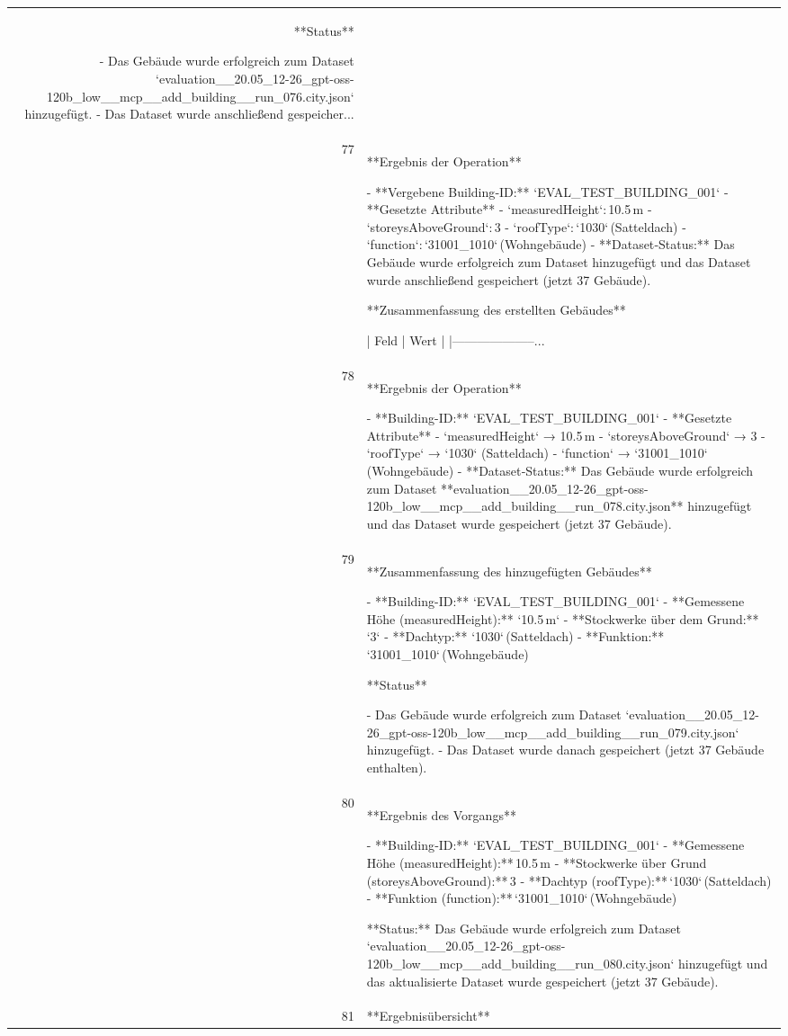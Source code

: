 \documentclass[a4paper,11pt]{article}
\begin{document}
\begin{table}[ht]
\begin{tabular}{r p{12cm}}
**Status**

- Das Gebäude wurde erfolgreich zum Dataset `evaluation\_\_20.05\_12-26\_gpt-oss-120b\_low\_\_mcp\_\_add\_building\_\_run\_076.city.json` hinzugefügt.  
- Das Dataset wurde anschließend gespeicher... \\
77 & **Ergebnis der Operation**

- **Vergebene Building‑ID:** `EVAL\_TEST\_BUILDING\_001`  
- **Gesetzte Attribute**  
  - `measuredHeight`: 10.5 m  
  - `storeysAboveGround`: 3  
  - `roofType`: `1030` (Satteldach)  
  - `function`: `31001\_1010` (Wohngebäude)  
- **Dataset‑Status:** Das Gebäude wurde erfolgreich zum Dataset hinzugefügt und das Dataset wurde anschließend gespeichert (jetzt 37 Gebäude).  

**Zusammenfassung des erstellten Gebäudes**  

| Feld                | Wert |
|--------------------... \\
78 & **Ergebnis der Operation**

- **Building-ID:** `EVAL\_TEST\_BUILDING\_001`  
- **Gesetzte Attribute**  
  - `measuredHeight` → 10.5 m  
  - `storeysAboveGround` → 3  
  - `roofType` → `1030` (Satteldach)  
  - `function` → `31001\_1010` (Wohngebäude)  
- **Dataset‑Status:** Das Gebäude wurde erfolgreich zum Dataset **evaluation\_\_20.05\_12-26\_gpt-oss-120b\_low\_\_mcp\_\_add\_building\_\_run\_078.city.json** hinzugefügt und das Dataset wurde gespeichert (jetzt 37 Gebäude). \\
79 & **Zusammenfassung des hinzugefügten Gebäudes**

- **Building-ID:** `EVAL\_TEST\_BUILDING\_001`  
- **Gemessene Höhe (measuredHeight):** `10.5 m`  
- **Stockwerke über dem Grund:** `3`  
- **Dachtyp:** `1030` (Satteldach)  
- **Funktion:** `31001\_1010` (Wohngebäude)  

**Status**

- Das Gebäude wurde erfolgreich zum Dataset `evaluation\_\_20.05\_12-26\_gpt-oss-120b\_low\_\_mcp\_\_add\_building\_\_run\_079.city.json` hinzugefügt.  
- Das Dataset wurde danach gespeichert (jetzt 37 Gebäude enthalten). \\
80 & **Ergebnis des Vorgangs**

- **Building‑ID:** `EVAL\_TEST\_BUILDING\_001`  
- **Gemessene Höhe (measuredHeight):** 10.5 m  
- **Stockwerke über Grund (storeysAboveGround):** 3  
- **Dachtyp (roofType):** `1030` (Satteldach)  
- **Funktion (function):** `31001\_1010` (Wohngebäude)  

**Status:** Das Gebäude wurde erfolgreich zum Dataset `evaluation\_\_20.05\_12-26\_gpt-oss-120b\_low\_\_mcp\_\_add\_building\_\_run\_080.city.json` hinzugefügt und das aktualisierte Dataset wurde gespeichert (jetzt 37 Gebäude). \\
81 & **Ergebnisübersicht**


\end{tabular}
\end{table}
\end{document}
